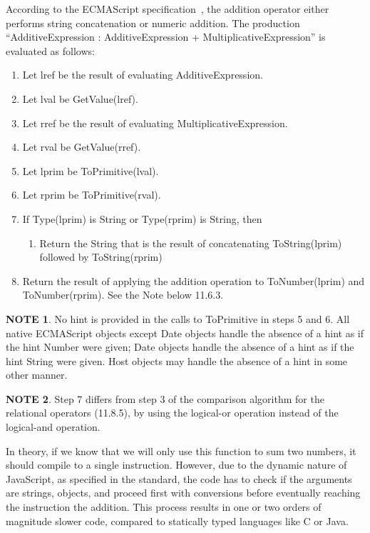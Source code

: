 \begin{displayquote}
According to the ECMAScript specification~\cite{ecmascript},
the addition operator either performs string concatenation or numeric addition.
The production ``AdditiveExpression : AdditiveExpression + MultiplicativeExpression''
is evaluated as follows:

\begin{enumerate}
    \item Let lref be the result of evaluating AdditiveExpression.
    \item Let lval be GetValue(lref).
    \item Let rref be the result of evaluating MultiplicativeExpression.
    \item Let rval be GetValue(rref).
    \item Let lprim be ToPrimitive(lval).
    \item Let rprim be ToPrimitive(rval).
    \item If Type(lprim) is String or Type(rprim) is String, then
    \begin{enumerate}
        \item     Return the String that is the result of concatenating ToString(lprim) followed by ToString(rprim)
    \end{enumerate}
    \item Return the result of applying the addition operation to ToNumber(lprim) and ToNumber(rprim). See the Note below 11.6.3.
\end{enumerate}

\textbf{NOTE 1}. No hint is provided in the calls to ToPrimitive in steps 5 and 6. All native ECMAScript objects except Date objects handle the absence of a hint as if the hint Number were given; Date objects handle the absence of a hint as if the hint String were given. Host objects may handle the absence of a hint in some other manner.

\textbf{NOTE 2}. Step 7 differs from step 3 of the comparison algorithm for the relational operators (11.8.5), by using the logical-or operation instead of the logical-and operation.
\end{displayquote}


In theory, if we know that we will only use this function
to sum two numbers, it should compile to a single instruction.
However, due to the dynamic nature of JavaScript,
as specified in the standard, the code has to check if the arguments
are strings, objects, and proceed first with conversions before
eventually reaching the instruction  the addition.
This process results in one or two orders of magnitude slower code,
compared to statically typed languages like C or Java.

